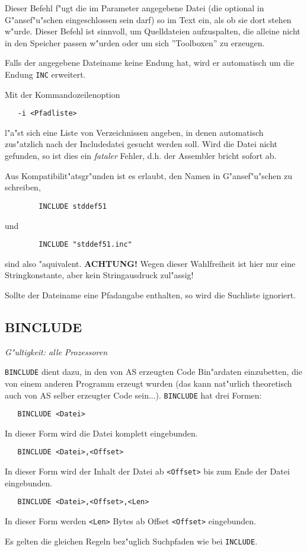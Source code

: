 \documentclass[12pt,a4paper,twoside]{report}
\makeatletter
\newcommand{\ii}[1]{{\it #1}}
\newcommand{\bb}[1]{{\bf #1}}
\newcommand{\tty}[1]{{\tt #1}}
\newcommand{\ttindex}[1]{\index{#1@{\tt #1}}}
\makeatother
\begin{document}
{Dieser Befehl f"ugt die im Parameter angegebene Datei (die optional in
G"an\-se\-f"u"s\-chen eingeschlossen sein darf) so im Text ein, als ob sie dort
stehen w"urde.  Dieser Befehl ist sinnvoll, um Quelldateien aufzuspalten,
die alleine nicht in den Speicher passen w"urden oder um sich ''Toolboxen''
zu erzeugen.
\par
Falls der angegebene Dateiname keine Endung hat, wird er automatisch
um die Endung \tty{INC} erweitert.
\par
Mit der Kommandozeilenoption
\begin{verbatim}
   -i <Pfadliste>
\end{verbatim}
l"a"st sich eine Liste von Verzeichnissen angeben, in denen automatisch
zus"atzlich nach der Includedatei gesucht werden soll.  Wird die Datei
nicht gefunden, so ist dies ein \ii{fataler} Fehler, d.h. der Assembler
bricht sofort ab.
\par
Aus Kompatibilit"atsgr"unden ist es erlaubt, den Namen in G"ansef"u"schen
zu schreiben,
\begin{verbatim}
        INCLUDE stddef51
\end{verbatim}
und
\begin{verbatim}
        INCLUDE "stddef51.inc"
\end{verbatim}
sind also "aquivalent.  \bb{ACHTUNG!} Wegen dieser Wahlfreiheit ist
hier nur eine Stringkonstante, aber kein Stringausdruck zul"assig!
\par
Sollte der Dateiname eine Pfadangabe enthalten, so wird die Suchliste
ignoriert.


\subsection{BINCLUDE}
\ttindex{BINCLUDE}

{\em G"ultigkeit: alle Prozessoren}

\tty{BINCLUDE} dient dazu, in den von AS erzeugten Code Bin"ardaten 
einzubetten, die von einem anderen Programm erzeugt wurden (das kann 
nat"urlich theoretisch auch von AS selber erzeugter Code sein...).
\tty{BINCLUDE} hat drei Formen:
\begin{verbatim}
   BINCLUDE <Datei>
\end{verbatim}
In dieser Form wird die Datei komplett eingebunden.
\begin{verbatim} 
   BINCLUDE <Datei>,<Offset>
\end{verbatim}
In dieser Form wird der Inhalt der Datei ab \verb!<Offset>! bis zum Ende
der Datei eingebunden.
\begin{verbatim}
   BINCLUDE <Datei>,<Offset>,<Len>
\end{verbatim}
In dieser Form werden \verb!<Len>! Bytes ab Offset \verb!<Offset>! eingebunden.
\par
Es gelten die gleichen Regeln bez"uglich Suchpfaden wie bei \tty{INCLUDE}.

}
\end{document}
